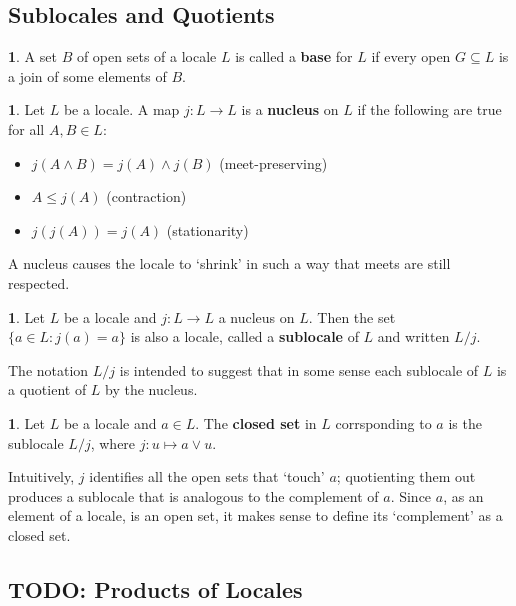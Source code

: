 \documentclass[oneside,english]{amsbook}
\numberwithin{section}{chapter}
\theoremstyle{plain}
\theoremstyle{definition}
\newtheorem{defn}[thm]{\protect\definitionname}
\providecommand{\definitionname}{Definition}
\begin{document}
\subsection{Sublocales and Quotients}

\begin{defn}
	A set $B$ of open sets of a locale $L$ is called a \textbf{base} for $L$ if every open $G\subseteq L$ is a join of some elements of $B$.
\end{defn}

\begin{defn}
	Let $L$ be a locale. A map $j:L\to L$ is a \textbf{nucleus} on $L$ if the following are true for all $A, B\in L$:
	\begin{itemize}
		\item {$j(A\land B) = j(A)\land j(B)$ (meet-preserving)}
		\item {$A\le j(A)$ (contraction)}
		\item{$j(j(A))= j(A)$ (stationarity)}
	\end{itemize}
\end{defn}

A nucleus causes the locale to `shrink' in such a way that meets are still respected. 

\begin{defn}
	Let $L$ be a locale and $j:L\to L$ a nucleus on $L$. Then the set $\{a\in L: j(a) = a\}$ is also a locale, called a \textbf{sublocale} of $L$ and written $L/j$.
\end{defn}

The notation $L/j$ is intended to suggest that in some sense each sublocale of $L$ is a quotient of $L$ by the nucleus.

\begin{defn}
	Let $L$ be a locale and $a\in L$. The \textbf{closed set} in $L$ corrsponding to $a$ is the sublocale $L/j$, where $j: u\mapsto a\lor u$. 
\end{defn}

Intuitively, $j$ identifies all the open sets that `touch' $a$; quotienting them out produces a sublocale that is analogous to the complement of $a$. Since $a$, as an element of a locale, is an open set, it makes sense to define its `complement' as a closed set.



\subsection{TODO: Products of Locales}
\end{document}
